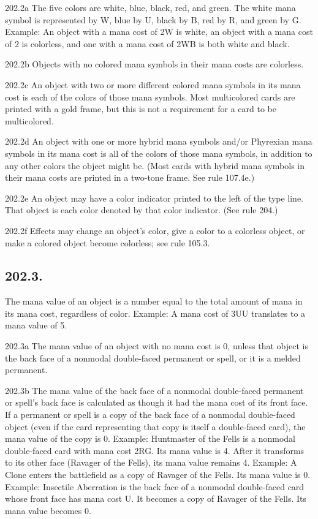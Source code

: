 202.2a The five colors are white, blue, black, red, and green. The white mana symbol is represented by {W}, blue by {U}, black by {B}, red by {R}, and green by {G}.
Example: An object with a mana cost of {2}{W} is white, an object with a mana cost of {2} is colorless, and one with a mana cost of {2}{W}{B} is both white and black.

202.2b Objects with no colored mana symbols in their mana costs are colorless.

202.2c An object with two or more different colored mana symbols in its mana cost is each of the colors of those mana symbols. Most multicolored cards are printed with a gold frame, but this is not a requirement for a card to be multicolored.

202.2d An object with one or more hybrid mana symbols and/or Phyrexian mana symbols in its mana cost is all of the colors of those mana symbols, in addition to any other colors the object might be. (Most cards with hybrid mana symbols in their mana costs are printed in a two-tone frame. See rule 107.4e.)

202.2e An object may have a color indicator printed to the left of the type line. That object is each color denoted by that color indicator. (See rule 204.)

202.2f Effects may change an object’s color, give a color to a colorless object, or make a colored object become colorless; see rule 105.3.

\subsection*{202.3.}
The mana value of an object is a number equal to the total amount of mana in its mana cost, regardless of color.
Example: A mana cost of {3}{U}{U} translates to a mana value of 5.

202.3a The mana value of an object with no mana cost is 0, unless that object is the back face of a nonmodal double-faced permanent or spell, or it is a melded permanent.

202.3b The mana value of the back face of a nonmodal double-faced permanent or spell’s back face is calculated as though it had the mana cost of its front face. If a permanent or spell is a copy of the back face of a nonmodal double-faced object (even if the card representing that copy is itself a double-faced card), the mana value of the copy is 0.
Example: Huntmaster of the Fells is a nonmodal double-faced card with mana cost {2}{R}{G}. Its mana value is 4. After it transforms to its other face (Ravager of the Fells), its mana value remains 4.
Example: A Clone enters the battlefield as a copy of Ravager of the Fells. Its mana value is 0.
Example: Insectile Aberration is the back face of a nonmodal double-faced card whose front face has mana cost {U}. It becomes a copy of Ravager of the Fells. Its mana value becomes 0.

